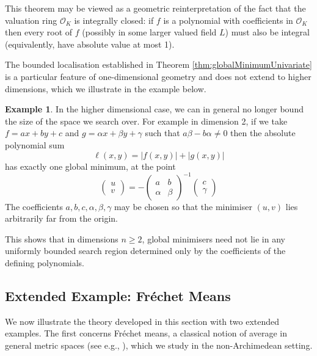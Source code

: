 \documentclass[10pt]{article}
\theoremstyle{definition}
\newtheorem{example}[theorem]{Example}
\begin{document}
This theorem may be viewed as a geometric reinterpretation of the fact that the valuation ring $\mathcal{O}_K$ is integrally closed: if $f$ is a polynomial with coefficients in $\mathcal{O}_K$ then every root of $f$ (possibly in some larger valued field $L$) must also be integral (equivalently, have absolute value at most 1).

The bounded localisation established in Theorem \ref{thm:globalMinimumUnivariate} is a particular feature of one-dimensional geometry and does not extend to higher dimensions, which we illustrate in the example below.

\begin{example}
    In the higher dimensional case, we can in general no longer bound the size of the space we search over. For example in dimension 2, if we take $f = ax + by + c$ and $g = \alpha x + \beta y + \gamma$ such that $a\beta - b\alpha \ne 0$
    then the absolute polynomial sum
    $$
      \ell(x, y) = \lvert f(x, y) \rvert + \lvert g(x, y) \rvert 
    $$
    has exactly one global minimum, at the point
    $$
        \begin{pmatrix}
            u \\ v
        \end{pmatrix} =- \begin{pmatrix}
            a & b \\
            \alpha & \beta
        \end{pmatrix} ^ {-1} 
        \begin{pmatrix}
            c \\ \gamma
        \end{pmatrix}
    $$
    The coefficients $a, b, c, \alpha, \beta, \gamma$ may be chosen so that the minimiser $(u, v)$ lies arbitrarily far from the origin.
\end{example}

This shows that in dimensions $n\geq 2$, global minimisers need not lie in any uniformly bounded search region determined only by the coefficients of the defining polynomials.

\subsection{Extended Example: Fr\'echet Means}

We now illustrate the theory developed in this section with two extended examples. The first concerns Fr\'echet means, a classical notion of average in general metric spaces (see e.g., \cite{Lin2025-qn,Ferry2026-ns,talbut2026uniqueness}), which we study in the non-Archimedean setting.
\end{document}
